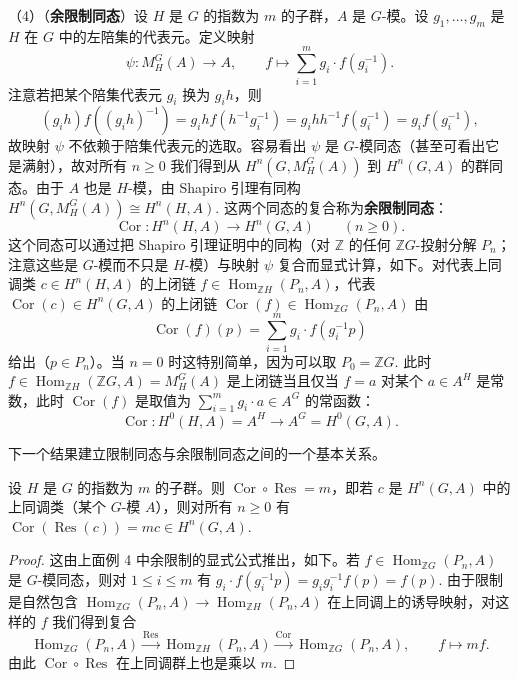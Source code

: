 （4）（\textbf{余限制同态}）设 \(H\) 是 \(G\) 的指数为 \(m\) 的子群，\(A\) 是 \(G\)-模。设 \(g_1, \ldots, g_m\) 是 \(H\) 在 \(G\) 中的左陪集的代表元。定义映射
\[
\psi : M_H^G(A) \to A, \qquad f \mapsto \sum_{i=1}^{m}g_i \cdot f(g_i^{-1}).
\]
注意若把某个陪集代表元 \(g_i\) 换为 \(g_ih\)，则
\[
(g_ih)f((g_ih)^{-1}) = g_ihf(h^{-1}g_i^{-1}) = g_ihh^{-1}f(g_i^{-1}) = g_if(g_i^{-1}),
\]
故映射 \(\psi\) 不依赖于陪集代表元的选取。容易看出 \(\psi\) 是 \(G\)-模同态（甚至可看出它是满射），故对所有 \(n \geq 0\) 我们得到从 \(H^n(G, M_H^G(A))\) 到 \(H^n(G, A)\) 的群同态。由于 \(A\) 也是 \(H\)-模，由 Shapiro 引理有同构 \(H^n(G, M_H^G(A)) \cong H^n(H, A)\). 这两个同态的复合称为\textbf{余限制同态}：
\[
\operatorname{Cor} : H^n(H, A) \to H^n(G, A) \qquad (n \geq 0).
\]
这个同态可以通过把 Shapiro 引理证明中的同构（对 \(\mathbb{Z}\) 的任何 \(\mathbb{Z}G\)-投射分解 \(P_n\)；注意这些是 \(G\)-模而不只是 \(H\)-模）与映射 \(\psi\) 复合而显式计算，如下。对代表上同调类 \(c \in H^n(H, A)\) 的上闭链 \(f \in \operatorname{Hom}_{\mathbb{Z}H}(P_n, A)\)，代表 \(\operatorname{Cor}(c) \in H^n(G, A)\) 的上闭链 \(\operatorname{Cor}(f) \in \operatorname{Hom}_{\mathbb{Z}G}(P_n, A)\) 由
\[
\operatorname{Cor}(f)(p) = \sum_{i=1}^{m}g_i \cdot f(g_i^{-1}p)
\]
给出（\(p \in P_n\)）。当 \(n = 0\) 时这特别简单，因为可以取 \(P_0 = \mathbb{Z}G\). 此时 \(f \in \operatorname{Hom}_{\mathbb{Z}H}(\mathbb{Z}G, A) = M_H^G(A)\) 是上闭链当且仅当 \(f = a\) 对某个 \(a \in A^H\) 是常数，此时 \(\operatorname{Cor}(f)\) 是取值为 \(\sum_{i=1}^{m}g_i \cdot a \in A^G\) 的常函数：
\[
\operatorname{Cor} : H^0(H, A) = A^H \to A^G = H^0(G, A).
\]

下一个结果建立限制同态与余限制同态之间的一个基本关系。

\begin{proposition}\label{pro:17.26}
设 \(H\) 是 \(G\) 的指数为 \(m\) 的子群。则 \(\operatorname{Cor} \circ \operatorname{Res} = m\)，即若 \(c\) 是 \(H^n(G, A)\) 中的上同调类（某个 \(G\)-模 \(A\)），则对所有 \(n \geq 0\) 有 \(\operatorname{Cor}(\operatorname{Res}(c)) = mc \in H^n(G, A)\).
\end{proposition}

\begin{proof}
这由上面例 4 中余限制的显式公式推出，如下。若 \(f \in \operatorname{Hom}_{\mathbb{Z}G}(P_n, A)\) 是 \(G\)-模同态，则对 \(1 \leq i \leq m\) 有 \(g_i \cdot f(g_i^{-1}p) = g_ig_i^{-1}f(p) = f(p)\). 由于限制是自然包含 \(\operatorname{Hom}_{\mathbb{Z}G}(P_n, A) \to \operatorname{Hom}_{\mathbb{Z}H}(P_n, A)\) 在上同调上的诱导映射，对这样的 \(f\) 我们得到复合
\[
\operatorname{Hom}_{\mathbb{Z}G}(P_n, A) \xrightarrow{\operatorname{Res}} \operatorname{Hom}_{\mathbb{Z}H}(P_n, A) \xrightarrow{\operatorname{Cor}} \operatorname{Hom}_{\mathbb{Z}G}(P_n, A), \qquad f \mapsto mf.
\]
由此 \(\operatorname{Cor} \circ \operatorname{Res}\) 在上同调群上也是乘以 \(m\).
\end{proof}

